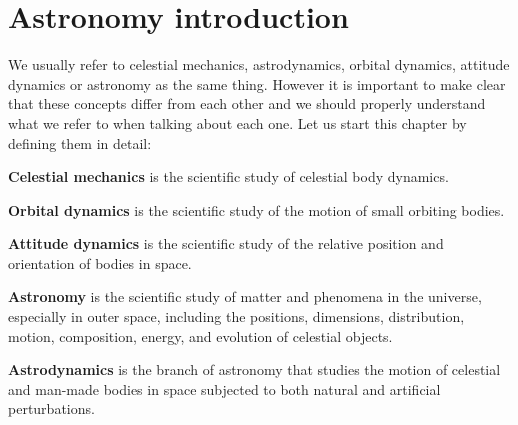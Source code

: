 \chapter[Astronomy introduction]{Astronomy introduction}
 
We usually refer to celestial mechanics, astrodynamics, orbital dynamics, attitude dynamics or astronomy as the same thing. However it is important to make clear that these concepts differ from each other and we should properly understand what we refer to when talking about each one. Let us start this chapter by defining them in detail:

\vspace{0.25cm}
\begin{Definition*}{}
	\textbf{Celestial mechanics} is the scientific study of celestial body dynamics.
\end{Definition*}
\vspace{0.25cm}

\vspace{0.25cm}
\begin{Definition*}{}
	\textbf{Orbital dynamics} is the scientific study of the motion of small orbiting bodies.
\end{Definition*}
\vspace{0.25cm}

\vspace{0.25cm}
\begin{Definition*}{}
	\textbf{Attitude dynamics} is the scientific study of the relative position and orientation of bodies in space.
\end{Definition*}
\vspace{0.25cm}

\vspace{0.25cm}
\begin{Definition*}{}
	\textbf{Astronomy} is  the scientific study of matter and phenomena in the universe, especially in outer space, including the positions, dimensions, distribution, motion, composition, energy, and evolution of celestial objects.
\end{Definition*}
\vspace{0.25cm}

\begin{Definition*}{}
	\textbf{Astrodynamics} is the branch of astronomy that studies the motion of celestial and man-made bodies in space subjected to both natural and artificial perturbations.
\end{Definition*}
\vspace{0.25cm}

